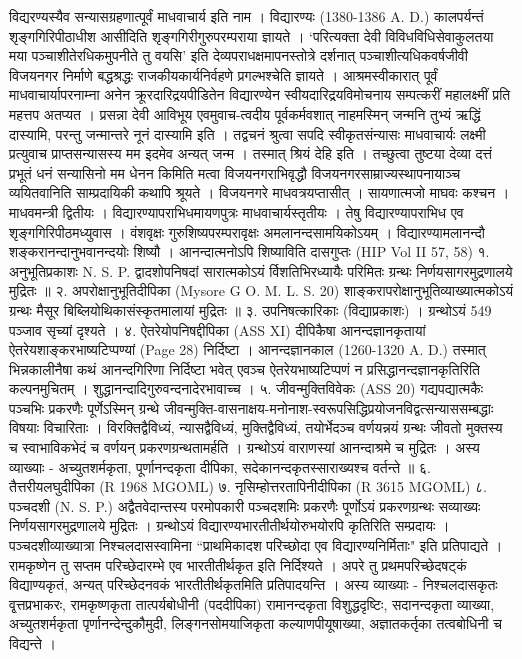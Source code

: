 विद्यरण्यस्यैव सन्यासग्रहणात्पूर्वं माधवाचार्य इति नाम । विद्यारण्यः (1380-1386 A. D.) कालपर्यन्तं शृङ्गगिरिपीठाधीश आसीदिति शृङ्गगिरीगुरुपरम्पराया ज्ञायते । `परित्यक्ता देवी विविधविधिसेवाकुलतया मया पञ्चाशीतेरधिकमुपनीते तु वयसि' इति देव्यपराधक्षमापनस्तोत्रे दर्शनात् पञ्चाशीत्यधिकवर्षजीवी विजयनगर निर्माणे बद्धश्रद्धः राजकीयकार्यनिर्वहणे प्रगल्भश्चेति ज्ञायते । आश्रमस्वीकारात् पूर्वं माधवाचार्यापरनाम्ना अनेन क्रूरदारिद्रयपीडितेन विद्यारण्येन स्वीयदारिद्रयविमोचनाय सम्पत्करीं महालक्ष्मीं प्रति महत्तप अतप्यत । प्रसन्ना देवी आविभूय एवमुवाच-त्वदीय पूर्वकर्मवशात् नाहमस्मिन् जन्मनि तुभ्यं ऋद्धिं दास्यामि, परन्तु जन्मान्तरे नूनं दास्यामि इति । तद्वचनं श्रुत्वा सपदि स्वीकृतसंन्यासः माधवाचार्यः लक्ष्मी प्रत्युवाच प्राप्तसन्यासस्य मम इदमेव अन्यत् जन्म । तस्मात् श्रियं देहि इति । तच्छुत्वा तुष्टया देव्या दत्तं प्रभूतं धनं सन्यासिनो मम धेनन किमिति मत्वा विजयनगराभिवृद्धौ विजयनगरसाम्राज्यस्थापनायाञ्च व्ययितवानिति साम्प्रदायिकी कथापि श्रूयते ।
विजयनगरे माधवत्रयप्तासीत् । सायणात्मजो माघवः कश्चन । माधवमन्त्री द्वितीयः । विद्यारण्यापराभिधमायणपुत्रः माधवाचार्यस्तृतीयः । तेषु विद्यारण्यापराभिध एव शृङ्गगिरिपीठमध्युवास ।
वंशवृक्षः
गुरुशिष्यपरम्परावृक्षः
अमलानन्दसामयिकोऽयम् । विद्यारण्यामलानन्दौ शङ्करानन्दानुभवानन्दयोः शिष्यौ । आनन्दात्मनोऽपि शिष्याविति दासगुप्तः (HIP Vol II 57, 58)
१. अनुभूतिप्रकाशः N. S. P.
द्वादशोपनिषदां सारात्मकोऽयं र्विशतिभिरध्यायैः परिमितः ग्रन्थः निर्णयसागरमुद्रणालये मुद्रितः ॥
२. अपरोक्षानुभूतिदीपिका (Mysore G O. M. L. S. 20)
शाङ्करापरोक्षानुभूतिव्याख्यात्मकोऽयं ग्रन्थः मैसूर बिब्लियोथिकासंस्कृतमालायां मुद्रितः ॥
३. उपनिषत्कारिकाः (विद्याप्रकाशः) ।
ग्रन्थोऽयं 549 पञ्जाव सृच्यां दृश्यते ।
४. ऐतरेयोपनिषद्दीपिका (ASS XI)
दीपिकैषा आनन्दज्ञानकृतायां ऐतरेयशाङ्करभाष्यटिप्पण्यां (Page 28) निर्दिष्टा । आनन्दज्ञानकाल (1260-1320 A. D.) तस्मात् भिन्नकालीनैषा कथं आनन्दगिरिणा निर्दिष्टा भवेत् एवञ्च ऐतरेयभाष्यटिप्पणं न प्रसिद्धानन्दज्ञानकृतिरिति कल्पनमुचितम् । शुद्धानन्दादिगुरुवन्दनादेरभावाच्च ।
५. जीवन्मुक्तिविवेकः (ASS 20)
गद्यपद्यात्मकैः पञ्चभिः प्रकरणैः पूर्णेऽस्मिन् ग्रन्थे जीवन्मुक्ति-वासनाक्षय-मनोनाश-स्वरूपसिद्धिप्रयोजनविद्वत्सन्याससम्बद्धाः विषयाः विचारिताः । विरक्तिद्वैविध्यं, न्यासद्वैविध्यं, मुक्तिद्वैविध्यं, तयोर्भेदञ्च वर्णयन्नयं ग्रन्थः जीवतो मुक्तस्य च स्वाभाविकभेदं च वर्णयन् प्रकरणग्रन्थतामर्हति । ग्रन्थोऽयं वाराणस्यां आनन्दाश्रमे च मुद्रितः । अस्य व्याख्याः - अच्युतशर्मकृता, पूर्णानन्दकृता दीपिका, सदेकानन्दकृतस्साराख्यश्च वर्तन्ते ॥
६. तैत्तरीयलघुदीपिका (R 1968 MGOML)
७. नृसिम्होत्तरतापिनीदीपिका (R 3615 MGOML)
८. पञ्चदशी (N. S. P.)
अद्वैतवेदान्तस्य परमोपकारी पञ्चदशमिः प्रकरणैः पूर्णोऽयं प्रकरणग्रन्थः सव्याख्यः निर्णयसागरमुद्रणालये मुद्रितः । ग्रन्थोऽयं विद्यारण्यभारतीतीर्थयोरुभयोरपि कृतिरिति सम्प्रदायः । पञ्चदशीव्याख्यात्रा निश्चलदासस्वामिना ``प्राथमिकादश परिच्छोदा एव विद्यारण्यनिर्मिताः" इति प्रतिपाद्यते । रामकृष्णेन तु सप्तम परिच्छेदारम्भे एव भारतीतीर्थकृत इति निर्दिश्यते । अपरे तु प्रथमपरिच्छेदषट्कं विद्याण्यकृतं, अन्यत् परिच्छेदनवकं भारतीतीर्थकृतमिति प्रतिपादयन्ति । अस्य व्याख्याः - निश्चलदासकृतः वृ्त्तप्रभाकरः, रामकृष्णकृता तात्पर्यबोधीनी (पददीपिका) रामानन्दकृता विशुद्धदृष्टिः, सदानन्दकृता व्याख्या, अच्युतशर्मकृता पृर्णानन्देन्दुकौमुदी, लिङ्गनसोमयाजिकृता कल्याणपीयूषाख्या, अज्ञातकर्तृका तत्वबोधिनी च विद्यन्ते ।
